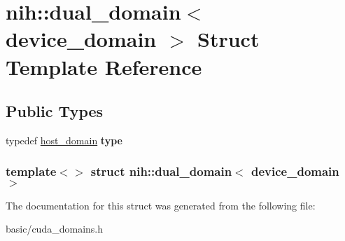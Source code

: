 \hypertarget{structnih_1_1dual__domain_3_01device__domain_01_4}{
\section{nih\-:\-:dual\-\_\-domain$<$ device\-\_\-domain $>$ \-Struct \-Template \-Reference}
\label{structnih_1_1dual__domain_3_01device__domain_01_4}
}
\subsection*{\-Public \-Types}
\begin{DoxyCompactItemize}
\item 
\hypertarget{structnih_1_1dual__domain_3_01device__domain_01_4_add83439996db222cc109114d5005ca09}{
typedef \hyperlink{structnih_1_1host__domain}{host\-\_\-domain} {\bfseries type}}
\label{structnih_1_1dual__domain_3_01device__domain_01_4_add83439996db222cc109114d5005ca09}

\end{DoxyCompactItemize}
\subsubsection*{template$<$$>$ struct nih\-::dual\-\_\-domain$<$ device\-\_\-domain $>$}



\-The documentation for this struct was generated from the following file\-:\begin{DoxyCompactItemize}
\item 
basic/cuda\-\_\-domains.\-h\end{DoxyCompactItemize}
